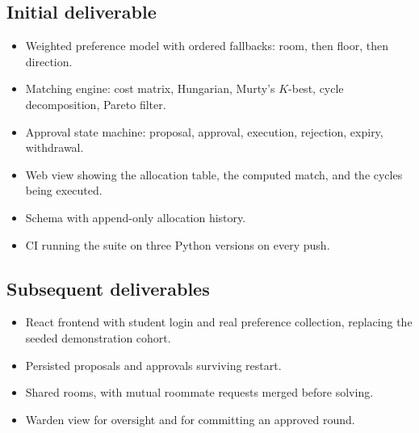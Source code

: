 \documentclass[11pt,a4paper]{article}
\begin{document}
\subsection{Initial deliverable}
\begin{itemize}[leftmargin=0.7cm]
    \item Weighted preference model with ordered
      fallbacks: room, then floor, then direction.
    \item Matching engine: cost matrix, Hungarian,
      Murty's $K$-best, cycle decomposition, Pareto
      filter.
    \item Approval state machine: proposal, approval,
      execution, rejection, expiry, withdrawal.
    \item Web view showing the allocation table, the
      computed match, and the cycles being executed.
    \item Schema with append-only allocation history.
    \item CI running the suite on three Python versions
      on every push.
\end{itemize}

\subsection{Subsequent deliverables}
\begin{itemize}[leftmargin=0.7cm]
    \item React frontend with student login and real
      preference collection, replacing the seeded
      demonstration cohort.
    \item Persisted proposals and approvals surviving
      restart.
    \item Shared rooms, with mutual roommate requests
      merged before solving.
    \item Warden view for oversight and for committing
      an approved round.
\end{itemize}
\end{document}
